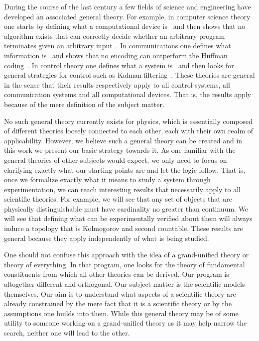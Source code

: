 \documentclass[letterpaper]{article}
\theoremstyle{plain}%
\theoremstyle{definition}
\theoremstyle{remark}
\numberwithin{equation}{section}
\begin{document}
During the course of the last century a few fields of science and engineering have developed an associated general theory. For example, in computer science theory one starts by defining what a computational device is~\cite{Turing} and then shows that no algorithm exists that can correctly decide whether an arbitrary program terminates given an arbitrary input~\cite{Sipser}. In communications one defines what information is~\cite{Shannon} and shows that no encoding can outperform the Huffman coding~\cite{Pierce}. In control theory one defines what a system is~\cite{Brogan} and then looks for general strategies for control such as Kalman filtering~\cite{Kalman}. These theories are general in the sense that their results respectively apply to all control systems, all communication systems and all computational devices. That is, the results apply because of the mere definition of the subject matter.

No such general theory currently exists for physics, which is essentially composed of different theories loosely connected to each other, each with their own realm of applicability. However, we believe such a general theory can be created and in this work we present our basic strategy towards it. As one familiar with the general theories of other subjects would expect, we only need to focus on clarifying exactly what our starting points are and let the logic follow. That is, once we formalize exactly what it means to study a system through experimentation, we can reach interesting results that necessarily apply to all scientific theories. For example, we will see that any set of objects that are physically distinguishable must have cardinality no greater than continuum. We will see that defining what can be experimentally verified about them will always induce a topology that is Kolmogorov and second countable. These results are general because they apply independently of what is being studied.

One should not confuse this approach with the idea of a grand-unified theory or theory of everything. In that program, one looks for the theory of fundamental constituents from which all other theories can be derived. Our program is altogether different and orthogonal. Our subject matter is the scientific models themselves. Our aim is to understand what aspects of a scientific theory are already constrained by the mere fact that it is a scientific theory or by the assumptions one builds into them. While this general theory may be of some utility to someone working on a grand-unified theory as it may help narrow the search, neither one will lead to the other.
\end{document}
